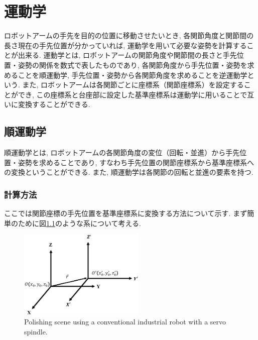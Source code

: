\documentclass{suribt}
\begin{document}
\chapter{運動学}
ロボットアームの手先を目的の位置に移動させたいとき, 各関節角度と関節間の長さ現在の手先位置が分かっていれば, 運動学を用いて必要な姿勢を計算することが出来る. 運動学とは, ロボットアームの関節角度や関節間の長さと手先位置・姿勢の関係を数式で表したものであり, 各関節角度から手先位置・姿勢を求めることを順運動学, 手先位置・姿勢から各関節角度を求めることを逆運動学という. 
また, ロボットアームは各関節ごとに座標系（関節座標系）を設定することができ, この座標系と台座部に設定した基準座標系は運動学に用いることで互いに変換することができる.

\section{順運動学}
順運動学とは, ロボットアームの各関節角度の変位（回転・並進）から手先位置・姿勢を求めることであり, すなわち手先位置の関節座標系から基準座標系への変換ということができる. また, 順運動学は各関節の回転と並進の要素を持つ. 

\subsection{計算方法}
ここでは関節座標の手先位置を基準座標系に変換する方法について示す. まず簡単のために図\ref{fig:translation}のような系について考える.
\begin{figure}[ht]
 \begin{center}
  \includegraphics[width=60mm,clip]{./figure/translation.eps}
  \caption{Polishing scene using a conventional industrial robot with a servo spindle.}
  \label{fig:translation}
 \end{center}
\end{figure}
\end{document}
